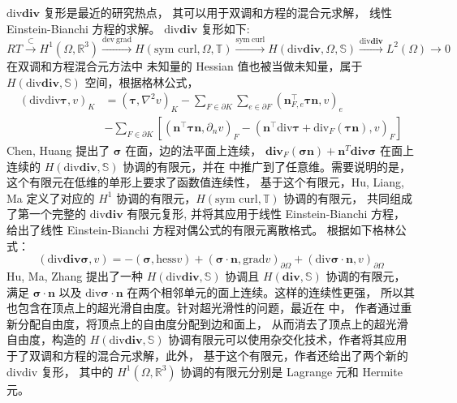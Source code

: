 \documentclass[lang=cn,a4paper,newtx]{elegantpaper}
\begin{document}
$\mathrm{div}\mathbf{div}$ 复形是最近的研究热点，
其可以用于双调和方程的混合元求解， 线性 Einstein-Bianchi 方程的求解。
$\mathrm{div}\mathbf{div}$ 复形如下: 
$$
RT \xrightarrow{\subset} H^1(\Omega, \mathbb{R}^3) 
\xrightarrow{\mathrm{dev}\ \mathrm{grad}} 
H(\text{sym curl}, \Omega, \mathbb{T}) \xrightarrow{\mathrm{sym\ curl}} 
H(\mathrm{div}\mathbf{div}, \Omega, \mathbb{S}) \xrightarrow{\mathrm{div}\mathbf{div}} L^2(\Omega) \rightarrow 0
$$ 
在双调和方程混合元方法中 未知量的 Hessian 值也被当做未知量，属于
$H(\mathrm{div}\mathbf{div}, \mathbb{S})$ 空间，根据格林公式， 
$$
\begin{aligned}
(\mathrm{div}\mathrm{div}\boldsymbol{\tau},v)_{K} & =
(\boldsymbol{\tau},\nabla^{2}v)_{K} - 
\sum_{F\in \partial K}\sum_{e\in \partial F}
(\boldsymbol{n}_{F,e}^{\intercal}\boldsymbol{\tau}\boldsymbol{n},v)_{e}\\
& - \sum_{F\in \partial K}
[(\boldsymbol{n}^{\intercal}\boldsymbol{\tau}\boldsymbol{n},\partial_{n}v)_{F} 
- (\boldsymbol{n}^{\intercal}\mathrm{div}\boldsymbol{\tau}+\mathrm{div}_{F}
(\boldsymbol{\tau}\boldsymbol{n}),v)_{F}]
\end{aligned}
$$ 
Chen, Huang
\cite{Chenhuangdivdiv2020, chen2022finite} 
提出了 $\boldsymbol{\sigma}$ 在面，边的法平面上连续，
$\mathbf{div}_F(\boldsymbol{\sigma n})+\boldsymbol{n}^T 
\mathbf{div}\boldsymbol{\sigma}$ 在面上连续的 $H(\mathrm{div}\mathbf{div},
\mathbb{S})$ 协调的有限元，并在 \cite{chenhuangsiam2022finite}
中推广到了任意维。需要说明的是，这个有限元在低维的单形上要求了函数值连续性，
基于这个有限元，Hu, Liang, Ma \cite{huliangma2022conforming} 定义了对应的 $H^1$ 
协调的有限元，$H(\text{sym curl}, \mathbb{T})$ 协调的有限元，
共同组成了第一个完整的 $\mathrm{div}\mathbf{div}$ 有限元复形, 并将其应用于线性
Einstein-Bianchi 方程，给出了线性 Einstein-Bianchi
方程对偶公式的有限元离散格式。
根据如下格林公式：
$$
(\mathrm{div}\mathbf{div}\boldsymbol{\sigma}, v) = 
-(\boldsymbol{\sigma}, \mathrm{hess} v) +
(\boldsymbol{\sigma}\cdot \boldsymbol{n}, \mathrm{grad} v)_{\partial \Omega}
+ (\mathrm{div}\boldsymbol{\sigma}\cdot \boldsymbol{n}, v)_{\partial \Omega}
$$ 
Hu, Ma, Zhang \cite{hu2021family}
提出了一种 $H(\mathrm{div}\mathbf{div}, \mathbb{S})$ 协调且 
$H(\mathbf{div}, \mathbb{S})$ 协调的有限元，满足
$\boldsymbol{\sigma}\cdot \boldsymbol{n}$ 以及
$\mathrm{div}\boldsymbol{\sigma}\cdot \boldsymbol{n}$
在两个相邻单元的面上连续。这样的连续性更强，
所以其也包含在顶点上的超光滑自由度。针对超光滑性的问题，最近在
\cite{chen2024new} 中，
作者通过重新分配自由度，将顶点上的自由度分配到边和面上，
从而消去了顶点上的超光滑自由度，构造的 $H(\mathrm{div}\mathbf{div}, \mathbb{S})$
协调有限元可以使用杂交化技术，作者将其应用于了双调和方程的混合元求解，此外，
基于这个有限元，作者还给出了两个新的 divdiv 复形，
其中的 $H^1(\Omega, \mathbb{R}^3)$ 协调的有限元分别是 Lagrange 元和 Hermite 元。
\end{document}
